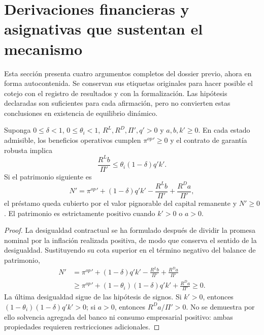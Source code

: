 \section{Derivaciones financieras y asignativas que sustentan el mecanismo}
\label{app:compact_financial_derivations}
Esta sección presenta cuatro argumentos completos del dossier previo,
ahora en forma autocontenida. Se conservan sus etiquetas originales para
hacer posible el cotejo con el registro de resultados y con la formalización.
Las hipótesis declaradas son suficientes para cada afirmación, pero no
convierten estas conclusiones en existencia de equilibrio dinámico.

\begin{lemma}
\label{lem:repayment}
Suponga $0\leq\delta<1$, $0\leq\theta_i<1$,
$R^L,R^D,\Pi',q'>0$ y $a,b,k'\geq0$.
En cada estado admisible, los beneficios operativos cumplen
$\pi^{op}{}'\geq0$ y el contrato de garantía robusta implica
\[
\frac{R^L b}{\Pi'}\leq
\theta_i(1-\delta)q'k'.
\]
Si el patrimonio siguiente es
\[
N'=\pi^{op}{}'+(1-\delta)q'k'
-\frac{R^L b}{\Pi'}+\frac{R^D a}{\Pi'},
\]
el préstamo queda cubierto por el valor pignorable del capital
remanente y $N'\geq0$. El patrimonio es estrictamente positivo
cuando $k'>0$ o $a>0$.
\end{lemma}
\begin{proof}
La desigualdad contractual se ha formulado después de dividir
la promesa nominal por la inflación realizada positiva, de modo
que conserva el sentido de la desigualdad. Sustituyendo su cota
superior en el término negativo del balance de patrimonio,
\begin{align*}
N'&=\pi^{op}{}'+(1-\delta)q'k'
-\frac{R^L b}{\Pi'}+\frac{R^D a}{\Pi'}\\
&\geq
\pi^{op}{}'+(1-\theta_i)(1-\delta)q'k'
+\frac{R^D a}{\Pi'}\geq0.
\end{align*}
La última desigualdad sigue de las hipótesis de signos.
Si $k'>0$, entonces $(1-\theta_i)(1-\delta)q'k'>0$;
si $a>0$, entonces $R^D a/\Pi'>0$. No se demuestra
por ello solvencia agregada del banco ni consumo empresarial
positivo: ambas propiedades requieren restricciones adicionales.
\end{proof}

